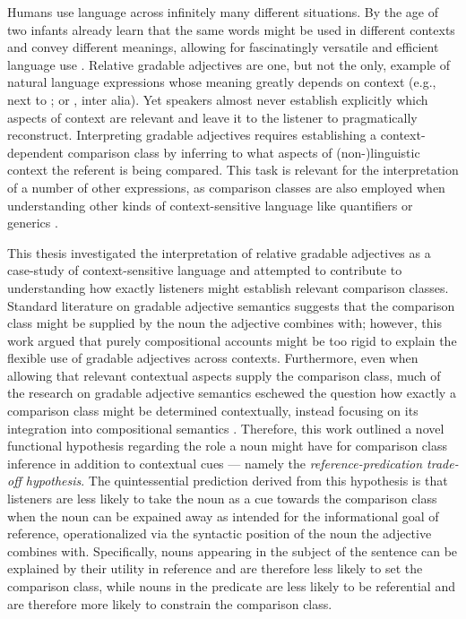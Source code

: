 Humans use language across infinitely many different situations. By the age of two infants already learn that the same words might be used in different contexts and convey different meanings, allowing for fascinatingly versatile and efficient language use \parencite{Mintz2002, ebeling1994children}. 
Relative gradable adjectives are one, but not the only, example of natural language expressions whose meaning greatly depends on context (e.g., next to \textcite[indexicals][]{braun2017}; or \textcite[anaphoras][]{goldberg2017one}, inter alia). Yet speakers almost never establish explicitly which aspects of context are relevant and leave it to the listener to pragmatically reconstruct. Interpreting gradable adjectives requires establishing a context-dependent comparison class by inferring to what aspects of (non-)linguistic context the referent is being compared. This task is relevant for the interpretation of a number of other expressions, as comparison classes are also employed when understanding other kinds of context-sensitive language like quantifiers \parencite[e.g., ``John ate \emph{many} of hot dogs",][]{scholler2017semantic} or generics \parencite[e.g., ``Dogs are friendly" \emph{[relative to other animals]},][]{tessler2019language}. 

This thesis investigated the interpretation of relative gradable adjectives as a case-study of context-sensitive language and attempted to contribute to understanding how exactly listeners might establish relevant comparison classes. 
Standard literature on gradable adjective semantics suggests that the comparison class might be supplied by the noun the adjective combines with; however, this work argued that purely compositional accounts might be too rigid to explain the flexible use of gradable adjectives across contexts. Furthermore, even when allowing that relevant contextual aspects supply the comparison class, much of the research on gradable adjective semantics eschewed the question how exactly a comparison class might be determined contextually, instead focusing on its integration into compositional semantics \parencite{Kennedy2007, kennedy2012, Kamp1975, Cresswell1976, Solt2009}. 
Therefore, this work outlined a novel functional hypothesis regarding the role a noun might have for comparison class inference in addition to contextual cues --- namely the \emph{reference-predication trade-off hypothesis}. The quintessential prediction derived from this hypothesis is that listeners are less likely to take the noun as a cue towards the comparison class when the noun can be expained away as intended for the informational goal of reference, operationalized via the syntactic position of the noun the adjective combines with. Specifically, nouns appearing in the subject of the sentence can be explained by their utility in reference and are therefore less likely to set the comparison class, while nouns in the predicate are less likely to be referential and are therefore more likely to constrain the comparison class.

